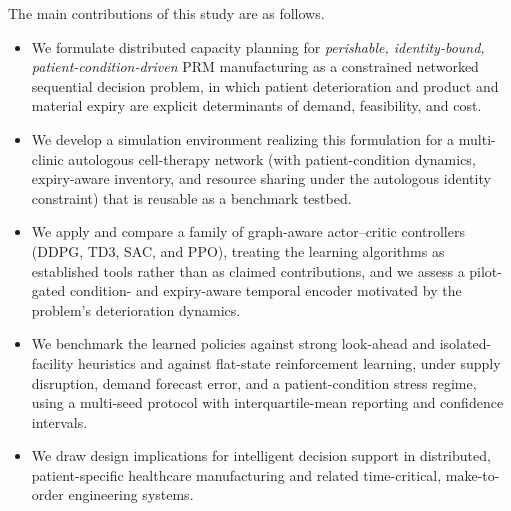 \documentclass[preprint,review,12pt,nonatbib]{elsarticle}
\providecommand{\DIFadd}[1]{{\protect\color{blue}#1}} %
\providecommand{\DIFdel}[1]{} %
\providecommand{\DIFaddbegin}{} %
\providecommand{\DIFaddend}{} %
\providecommand{\DIFdelbegin}{} %
\providecommand{\DIFdelend}{} %
\providecommand{\DIFscaledelfig}{0.5}
\newlength{\DIFdelgraphicswidth} %
\newlength{\DIFdelgraphicsheight} %
\providecommand{\DIFaddincludegraphics}[2][]{{\color{blue}\fbox{\DIFOincludegraphics[#1]{#2}}}} %
\providecommand{\DIFdelincludegraphics}[2][]{%
\sbox{\DIFdelgraphicsbox}{\DIFOincludegraphics[#1]{#2}}%
\settoboxwidth{\DIFdelgraphicswidth}{\DIFdelgraphicsbox} %
\settoboxtotalheight{\DIFdelgraphicsheight}{\DIFdelgraphicsbox} %
\scalebox{\DIFscaledelfig}{%
\parbox[b]{\DIFdelgraphicswidth}{\usebox{\DIFdelgraphicsbox}\\[-\baselineskip] \rule{\DIFdelgraphicswidth}{0em}}\llap{\resizebox{\DIFdelgraphicswidth}{\DIFdelgraphicsheight}{%
\setlength{\unitlength}{\DIFdelgraphicswidth}%
\begin{picture}(1,1)%
\thicklines\linethickness{2pt} %
{\color[rgb]{1,0,0}\put(0,0){\framebox(1,1){}}}%
{\color[rgb]{1,0,0}\put(0,0){\line( 1,1){1}}}%
{\color[rgb]{1,0,0}\put(0,1){\line(1,-1){1}}}%
\end{picture}%
}\hspace*{3pt}}} %
} %
\DeclareRobustCommand{\DIFaddbegin}{\DIFOaddbegin \let\includegraphics\DIFaddincludegraphics} %
\DeclareRobustCommand{\DIFaddend}{\DIFOaddend \let\includegraphics\DIFOincludegraphics} %
\DeclareRobustCommand{\DIFdelbegin}{\DIFOdelbegin \let\includegraphics\DIFdelincludegraphics} %
\DeclareRobustCommand{\DIFdelend}{\DIFOaddend \let\includegraphics\DIFOincludegraphics} %
\begin{document}
The main contributions of this study are as follows\DIFdelbegin \DIFdel{:
}\DIFdelend \DIFaddbegin \DIFadd{.
}\DIFaddend \begin{itemize}
    \item We formulate distributed \DIFdelbegin \DIFdel{PRM capacity planning as a sequential engineering decision probleminvolving capacity adjustment, consumable inventory replenishment, and network-level transshipment under demandand supply uncertainty}\DIFdelend \DIFaddbegin \DIFadd{capacity planning for }\emph{\DIFadd{perishable, identity-bound, patient-condition-driven}} \DIFadd{PRM manufacturing as a constrained networked sequential decision problem, in which patient deterioration and product and material expiry are explicit determinants of demand, feasibility, and cost}\DIFaddend .
    \item We develop a \DIFdelbegin \DIFdel{graph-aware deep reinforcement learning framework that combines graph convolutional state embedding with deep deterministic policy gradient learning}\DIFdelend \DIFaddbegin \DIFadd{simulation environment realizing this formulation for a multi-clinic autologous cell-therapy network (with patient-condition dynamics, expiry-aware inventory, and resource sharing under the autologous identity constraint) that is reusable as a benchmark testbed}\DIFaddend .
    \item We \DIFdelbegin \DIFdel{show how graph-based state representations allow the decision-maker to use both local facility conditions and neighboring-facility information when learning coordinated policies}\DIFdelend \DIFaddbegin \DIFadd{apply and compare a family of graph-aware actor--critic controllers (DDPG, TD3, SAC, and PPO), treating the learning algorithms as established tools rather than as claimed contributions, and we assess a pilot-gated condition- and expiry-aware temporal encoder motivated by the problem's deterioration dynamics}\DIFaddend .
    \item We \DIFdelbegin \DIFdel{evaluate the proposed framework against myopic, }\DIFdelend \DIFaddbegin \DIFadd{benchmark the learned policies against strong }\DIFaddend look-ahead \DIFdelbegin \DIFdel{, }\DIFdelend and isolated-facility heuristics \DIFaddbegin \DIFadd{and against flat-state reinforcement learning, }\DIFaddend under supply disruption\DIFdelbegin \DIFdel{and }\DIFdelend \DIFaddbegin \DIFadd{, }\DIFaddend demand forecast error\DIFdelbegin \DIFdel{scenarios}\DIFdelend \DIFaddbegin \DIFadd{, and a patient-condition stress regime, using a multi-seed protocol with interquartile-mean reporting and confidence intervals}\DIFaddend .
    \item We \DIFdelbegin \DIFdel{discuss the implications of the framework }\DIFdelend \DIFaddbegin \DIFadd{draw design implications }\DIFaddend for intelligent decision support in distributed, \DIFdelbegin \DIFdel{make-to-order healthcare manufacturing networks and related }\DIFdelend \DIFaddbegin \DIFadd{patient-specific healthcare manufacturing and related time-critical, make-to-order }\DIFaddend engineering systems.
\end{itemize}
\end{document}
